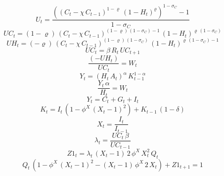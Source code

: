\begin{dmath}
{U}_{t}=\frac{\left(\left({C}_{t}-{{\chi}}\, {C}_{t-1}\right)^{1-{{\varrho}}}\, \left(1-{H}_{t}\right)^{{{\varrho}}}\right)^{1-{{\sigma_{C}}}}-1}{1-{{\sigma_{C}}}}
\end{dmath}
\begin{dmath}
{UC}_{t}=\left(1-{{\varrho}}\right)\, \left({C}_{t}-{{\chi}}\, {C}_{t-1}\right)^{\left(1-{{\varrho}}\right)\, \left(1-{{\sigma_{C}}}\right)-1}\, \left(1-{H}_{t}\right)^{{{\varrho}}\, \left(1-{{\sigma_{C}}}\right)}
\end{dmath}
\begin{dmath}
{UH}_{t}=\left(-{{\varrho}}\right)\, \left({C}_{t}-{{\chi}}\, {C}_{t-1}\right)^{\left(1-{{\varrho}}\right)\, \left(1-{{\sigma_{C}}}\right)}\, \left(1-{H}_{t}\right)^{{{\varrho}}\, \left(1-{{\sigma_{C}}}\right)-1}
\end{dmath}
\begin{dmath}
{UC}_{t}={{\beta}}\, {R}_{t}\, {UC}_{t+1}
\end{dmath}
\begin{dmath}
\frac{\left(-{UH}_{t}\right)}{{UC}_{t}}={W}_{t}
\end{dmath}
\begin{dmath}
{Y}_{t}=\left({H}_{t}\, {A}_{t}\right)^{{{\alpha}}}\, {K}_{t-1}^{1-{{\alpha}}}
\end{dmath}
\begin{dmath}
\frac{{Y}_{t}\, {{\alpha}}}{{H}_{t}}={W}_{t}
\end{dmath}
\begin{dmath}
{Y}_{t}={C}_{t}+{G}_{t}+{I}_{t}
\end{dmath}
\begin{dmath}
{K}_{t}={I}_{t}\, \left(1-{{\phi^X}}\, \left({X}_{t}-1\right)^{2}\right)+{K}_{t-1}\, \left(1-{{\delta}}\right)
\end{dmath}
\begin{dmath}
{X}_{t}=\frac{{I}_{t}}{{I}_{t-1}}
\end{dmath}
\begin{dmath}
{\lambda}_{t}=\frac{{UC}_{t}\, {{\beta}}}{{UC}_{t-1}}
\end{dmath}
\begin{dmath}
{Z1}_{t}={\lambda}_{t}\, \left({X}_{t}-1\right)\, 2\, {{\phi^X}}\, {X}_{t}^{2}\, {Q}_{t}
\end{dmath}
\begin{dmath}
{Q}_{t}\, \left(1-{{\phi^X}}\, \left({X}_{t}-1\right)^{2}-\left({X}_{t}-1\right)\, {{\phi^X}}\, 2\, {X}_{t}\right)+{Z1}_{t+1}=1
\end{dmath}
